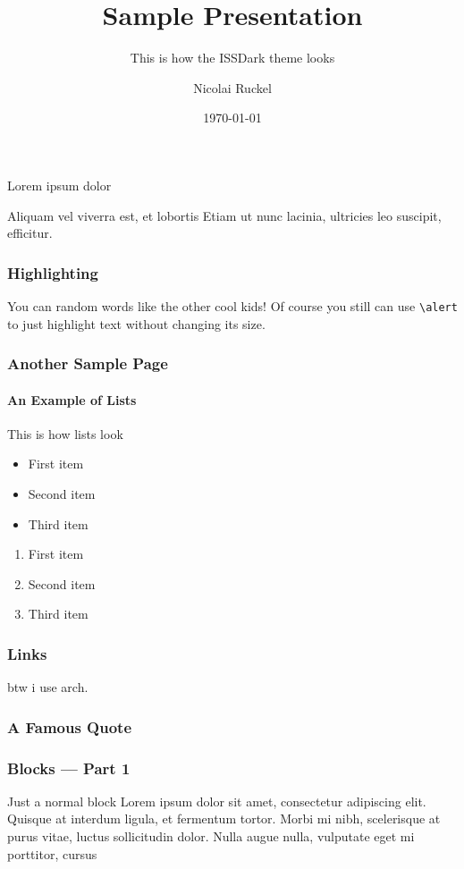 \documentclass[17pt,aspectratio=169]{beamer}
\title{Sample Presentation}
\subtitle{This is how the ISSDark theme looks}
\author{Nicolai Ruckel}
\date{\today}
\begin{document}
\begin{frame}
  \titlepage
\end{frame}

\begin{frame}
  \Huge Lorem ipsum dolor\par
  \Large Aliquam vel viverra est, et lobortis
  \vfill
  \flushright
  \normalsize Etiam ut nunc lacinia, ultricies leo suscipit, efficitur.
\end{frame}

\begin{frame}
  \frametitle{Highlighting}
  \Large
  You can  random words like  the other cool kids!
  \vfill\normalsize
  Of course you still can use \texttt{\textbackslash alert} to just
  \alert{highlight} text without changing its size.
\end{frame}

\begin{frame}
  \frametitle{Another Sample Page}
  \framesubtitle{An Example of Lists}
  This is how lists look
  \begin{itemize}
    \item First item
    \item Second item
    \item Third item
  \end{itemize}
  \begin{enumerate}
    \item First item
    \item Second item
    \item Third item
  \end{enumerate}
\end{frame}

\begin{frame}
  \frametitle{Links}
  btw i use arch\footnotemark.
\end{frame}

\begin{frame}
  \frametitle{A Famous Quote}
\end{frame}

\begin{frame}
  \frametitle{Blocks --- Part 1}
  \begin{block}{Just a normal block}
    Lorem ipsum dolor sit amet, consectetur adipiscing elit. Quisque at interdum
    ligula, et fermentum tortor. Morbi mi nibh, scelerisque at purus vitae,
    luctus sollicitudin dolor. Nulla augue nulla, vulputate eget mi porttitor,
    cursus
  \end{block}
\end{frame}
\end{document}
